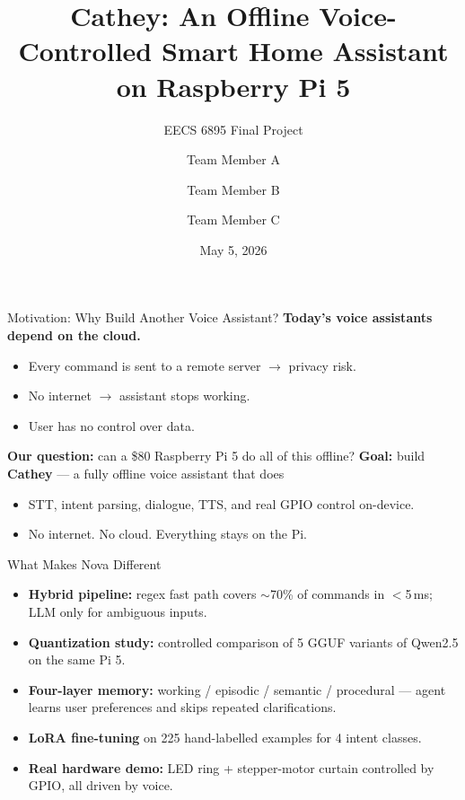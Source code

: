 \documentclass[aspectratio=169]{beamer}
\title[Nova]{Cathey: An Offline Voice-Controlled Smart Home Assistant on Raspberry Pi 5}
\subtitle{EECS 6895 Final Project}
\author{Team Member A \and Team Member B \and Team Member C}
\institute{Columbia University}
\date{May 5, 2026}
\begin{document}
\begin{frame}
\titlepage
\end{frame}

\begin{frame}{Motivation: Why Build Another Voice Assistant?}
\textbf{Today's voice assistants depend on the cloud.}
\begin{itemize}
  \item Every command is sent to a remote server $\rightarrow$ privacy risk.
  \item No internet $\rightarrow$ assistant stops working.
  \item User has no control over data.
\end{itemize}
\vspace{0.4em}
\textbf{Our question:} can a \$80 Raspberry Pi 5 do all of this offline?
\vspace{0.4em}
\textbf{Goal:} build \textbf{Cathey} — a fully offline voice assistant that does
\begin{itemize}
  \item STT, intent parsing, dialogue, TTS, and real GPIO control on-device.
  \item No internet. No cloud. Everything stays on the Pi.
\end{itemize}
\end{frame}

\begin{frame}{What Makes Nova Different}
\begin{itemize}
  \item \textbf{Hybrid pipeline:} regex fast path covers $\sim$70\% of commands in $<$5\,ms; LLM only for ambiguous inputs.
  \item \textbf{Quantization study:} controlled comparison of 5 GGUF variants of Qwen2.5 on the same Pi 5.
  \item \textbf{Four-layer memory:} working / episodic / semantic / procedural — agent learns user preferences and skips repeated clarifications.
  \item \textbf{LoRA fine-tuning} on 225 hand-labelled examples for 4 intent classes.
  \item \textbf{Real hardware demo:} LED ring + stepper-motor curtain controlled by GPIO, all driven by voice.
\end{itemize}
\end{frame}
\end{document}
